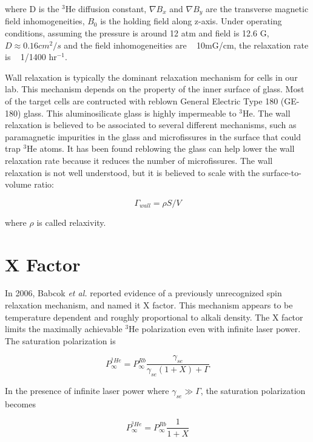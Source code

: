 where D is the $^{3}$He diffusion constant, $\nabla B_{x}$ and $\nabla B_{y}$ are the transverse magnetic field inhomogeneities, $B_{0}$ is the holding field along z-axis. Under operating conditions, assuming the pressure is around 12 atm and field is 12.6 G, $D\approx 0.16cm^{2}/s$ and the field inhomogeneities are ~ 10mG/cm, the relaxation rate is ~ 1/1400 hr$^{-1}$.

Wall relaxation is typically the dominant relaxation mechanism for cells in our lab. This mechanism depends on the property of the inner surface of glass. Most of the target cells are contructed with reblown General Electric Type 180 (GE-180) glass. This aluminosilicate glass is highly impermeable to $^{3}$He. The wall relaxation is believed to be associated to several different mechanisms, such as paramagnetic impurities in the glass and microfissures in the surface that could trap $^{3}$He atoms. It has been found reblowing the glass can help lower the wall relaxation rate because it reduces the number of microfissures. The wall relaxation is not well understood, but it is believed to scale with the surface-to-volume ratio:

\begin{equation}
\Gamma_{wall} = \rho S/V
\end{equation}

where $\rho$ is called relaxivity.

\section{X Factor}

In 2006, Babcok \emph{et al.} reported evidence of a previously unrecognized spin relaxation mechanism, and named it X factor. This mechanism appears to be temperature dependent and roughly proportional to alkali density. The X factor limits the maximally achievable $^{3}$He polarization even with infinite laser power. The saturation polarization is 

\begin{equation}
P_{\infty}^{^{3}He}=P_{\infty}^{Rb}\frac{\gamma_{se}}{\gamma_{se}(1+X)+\Gamma}
\end{equation}

In the presence of infinite laser power where $\gamma_{se} \gg \Gamma$, the saturation polarization becomes

\begin{equation}
P_{\infty}^{^{3}He}=P_{\infty}^{Rb}\frac{1}{1+X}
\end{equation}



















